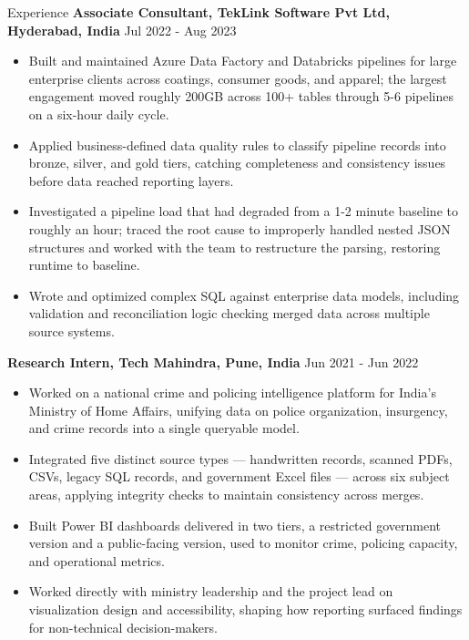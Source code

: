 \documentclass{resume}
\begin{document}
\begin{rSection}{Experience}
\vspace{0.4em}
\textbf{Associate Consultant, TekLink Software Pvt Ltd, Hyderabad, India} \hfill Jul 2022 - Aug 2023
\begin{itemize}
    \item Built and maintained Azure Data Factory and Databricks pipelines for large enterprise clients across coatings, consumer goods, and apparel; the largest engagement moved roughly 200GB across 100+ tables through 5-6 pipelines on a six-hour daily cycle.
    \item Applied business-defined data quality rules to classify pipeline records into bronze, silver, and gold tiers, catching completeness and consistency issues before data reached reporting layers.
    \item Investigated a pipeline load that had degraded from a 1-2 minute baseline to roughly an hour; traced the root cause to improperly handled nested JSON structures and worked with the team to restructure the parsing, restoring runtime to baseline.
    \item Wrote and optimized complex SQL against enterprise data models, including validation and reconciliation logic checking merged data across multiple source systems.
\end{itemize}

\textbf{Research Intern, Tech Mahindra, Pune, India} \hfill Jun 2021 - Jun 2022
\begin{itemize}
    \item Worked on a national crime and policing intelligence platform for India's Ministry of Home Affairs, unifying data on police organization, insurgency, and crime records into a single queryable model.
    \item Integrated five distinct source types --- handwritten records, scanned PDFs, CSVs, legacy SQL records, and government Excel files --- across six subject areas, applying integrity checks to maintain consistency across merges.
    \item Built Power BI dashboards delivered in two tiers, a restricted government version and a public-facing version, used to monitor crime, policing capacity, and operational metrics.
    \item Worked directly with ministry leadership and the project lead on visualization design and accessibility, shaping how reporting surfaced findings for non-technical decision-makers.
\end{itemize}

\end{rSection}
\end{document}
